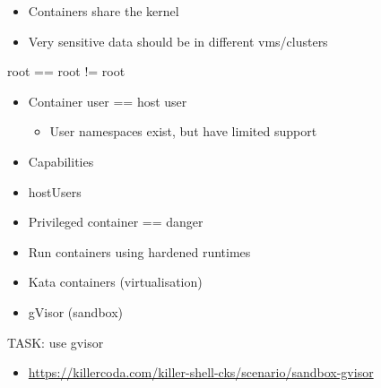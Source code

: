 \documentclass{dcpresentation}
\begin{document}
\begin{frame}
  \begin{itemize}
  \item Containers share the kernel
  \item \alert<2>{Very sensitive data should be in different vms/clusters}
  \end{itemize}
\end{frame}

\begin{frame}{root == root != root}
  \begin{itemize}
  \item Container user == host user
    \begin{itemize}
    \item User namespaces exist, but have limited support
    \end{itemize}
  \item Capabilities
  \item hostUsers
  \item Privileged container == danger
  \end{itemize}
\end{frame}



\begin{frame}
  \begin{itemize}
  \item Run containers using hardened runtimes
  \item Kata containers (virtualisation)
  \item gVisor (sandbox)
  \end{itemize}
\end{frame}

\begin{frame}{TASK: use gvisor}
 \begin{itemize}
  \item \url{https://killercoda.com/killer-shell-cks/scenario/sandbox-gvisor}
 \end{itemize}
\end{frame}

\end{document}
